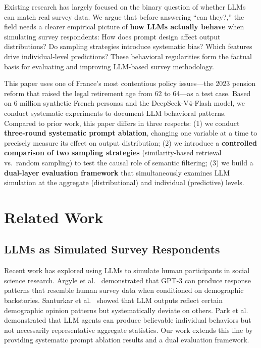 \documentclass[11pt,a4paper]{article}
\begin{document}
Existing research has largely focused on the binary question of whether LLMs can match real survey data. We argue that before answering ``can they?,'' the field needs a clearer empirical picture of \textbf{how LLMs actually behave} when simulating survey respondents: How does prompt design affect output distributions? Do sampling strategies introduce systematic bias? Which features drive individual-level predictions? These behavioral regularities form the factual basis for evaluating and improving LLM-based survey methodology.

This paper uses one of France's most contentious policy issues---the 2023 pension reform that raised the legal retirement age from 62 to 64---as a test case. Based on 6 million synthetic French personas and the DeepSeek-V4-Flash model, we conduct systematic experiments to document LLM behavioral patterns. Compared to prior work, this paper differs in three respects: (1) we conduct \textbf{three-round systematic prompt ablation}, changing one variable at a time to precisely measure its effect on output distribution; (2) we introduce a \textbf{controlled comparison of two sampling strategies} (similarity-based retrieval vs.\ random sampling) to test the causal role of semantic filtering; (3) we build a \textbf{dual-layer evaluation framework} that simultaneously examines LLM simulation at the aggregate (distributional) and individual (predictive) levels.

\section{Related Work}

\subsection{LLMs as Simulated Survey Respondents}

Recent work has explored using LLMs to simulate human participants in social science research. Argyle et al.~\cite{argyle2023out} demonstrated that GPT-3 can produce response patterns that resemble human survey data when conditioned on demographic backstories. Santurkar et al.~\cite{santurkar2023whose} showed that LLM outputs reflect certain demographic opinion patterns but systematically deviate on others. Park et al.~\cite{park2023generative} demonstrated that LLM agents can produce believable individual behaviors but not necessarily representative aggregate statistics. Our work extends this line by providing systematic prompt ablation results and a dual evaluation framework.
\end{document}
